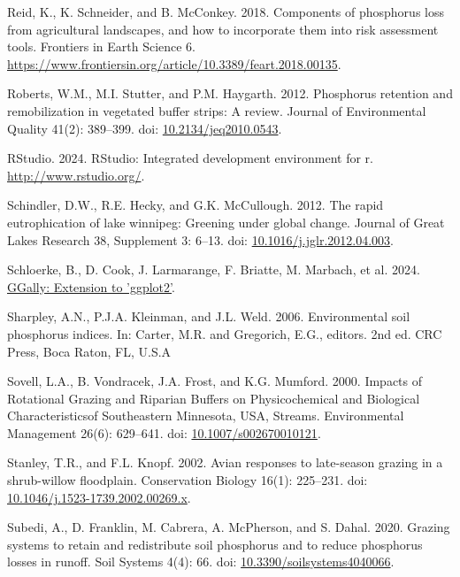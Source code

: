 \documentclass[
]{agujournal2019}
\newlength{\cslhangindent}
\newenvironment{CSLReferences}[2] %
 {\begin{list}{}{%
  \setlength{\itemindent}{0pt}
  \setlength{\leftmargin}{0pt}
  \setlength{\parsep}{0pt}
  \ifodd #1
   \setlength{\leftmargin}{\cslhangindent}
   \setlength{\itemindent}{-1\cslhangindent}
  \fi
  \setlength{\itemsep}{#2\baselineskip}}}
 {\end{list}}
\begin{document}
\begin{CSLReferences}{1}{1}
Reid, K., K. Schneider, and B. McConkey. 2018. Components of phosphorus
loss from agricultural landscapes, and how to incorporate them into risk
assessment tools. Frontiers in Earth Science 6.
\url{https://www.frontiersin.org/article/10.3389/feart.2018.00135}.

Roberts, W.M., M.I. Stutter, and P.M. Haygarth. 2012. Phosphorus
retention and remobilization in vegetated buffer strips: A review.
Journal of Environmental Quality 41(2): 389--399. doi:
\href{https://doi.org/10.2134/jeq2010.0543}{10.2134/jeq2010.0543}.

RStudio. 2024. RStudio: Integrated development environment for r.
\url{http://www.rstudio.org/}.

Schindler, D.W., R.E. Hecky, and G.K. McCullough. 2012. The rapid
eutrophication of lake winnipeg: Greening under global change. Journal
of Great Lakes Research 38, Supplement 3: 6--13. doi:
\href{https://doi.org/10.1016/j.jglr.2012.04.003}{10.1016/j.jglr.2012.04.003}.

Schloerke, B., D. Cook, J. Larmarange, F. Briatte, M. Marbach, et al.
2024. \href{https://CRAN.R-project.org/package=GGally}{GGally: Extension
to 'ggplot2'}.

Sharpley, A.N., P.J.A. Kleinman, and J.L. Weld. 2006. Environmental soil
phosphorus indices. In: Carter, M.R. and Gregorich, E.G., editors. 2nd
ed. CRC Press, Boca Raton, FL, U.S.A

Sovell, L.A., B. Vondracek, J.A. Frost, and K.G. Mumford. 2000. Impacts
of Rotational Grazing and Riparian Buffers on Physicochemical and
Biological Characteristicsof Southeastern Minnesota, USA, Streams.
Environmental Management 26(6): 629--641. doi:
\href{https://doi.org/10.1007/s002670010121}{10.1007/s002670010121}.

Stanley, T.R., and F.L. Knopf. 2002. Avian responses to late-season
grazing in a shrub-willow floodplain. Conservation Biology 16(1):
225--231. doi:
\href{https://doi.org/10.1046/j.1523-1739.2002.00269.x}{10.1046/j.1523-1739.2002.00269.x}.

Subedi, A., D. Franklin, M. Cabrera, A. McPherson, and S. Dahal. 2020.
Grazing systems to retain and redistribute soil phosphorus and to reduce
phosphorus losses in runoff. Soil Systems 4(4): 66. doi:
\href{https://doi.org/10.3390/soilsystems4040066}{10.3390/soilsystems4040066}.


\end{CSLReferences}
\end{document}
